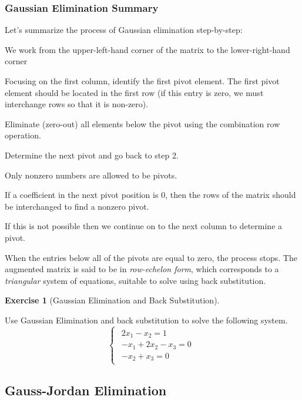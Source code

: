 \documentclass[
]{article}
\theoremstyle{definition}
\theoremstyle{definition}
\theoremstyle{definition}
\newtheorem{exercise}{Exercise}[section]
\theoremstyle{definition}
\theoremstyle{remark}
\begin{document}
\hypertarget{gaussian-elimination-summary}{%
\subsubsection{Gaussian Elimination Summary}\label{gaussian-elimination-summary}}

Let's summarize the process of Gaussian elimination step-by-step:

We work from the upper-left-hand corner of the matrix to the lower-right-hand corner

Focusing on the first column, identify the first pivot element. The first pivot element should be located in the first row (if this entry is zero, we must interchange rows so that it is non-zero).

Eliminate (zero-out) all elements below the pivot using the combination row operation.

Determine the next pivot and go back to step 2.

Only nonzero numbers are allowed to be pivots.

If a coefficient in the next pivot position is 0, then the rows of the matrix should be interchanged to find a nonzero pivot.

If this is not possible then we continue on to the next column to determine a pivot.

When the entries below all of the pivots are equal to zero, the process stops. The augmented matrix is said to be in \emph{row-echelon form}, which corresponds to a \emph{triangular} system of equations, suitable to solve using back substitution.

\begin{exercise}[Gaussian Elimination and Back Substitution]
\protect\hypertarget{exr:gaussianelim}{}\label{exr:gaussianelim}

Use Gaussian Elimination and back substitution to solve the following system.
\[\begin{cases}\begin{align}
2x_1-x_2=1\\
-x_1+2x_2-x_3=0\\
-x_2+x_3=0\end{align}\end{cases}\]
\vspace{3cm}

\end{exercise}

\hypertarget{gauss-jordan-elimination}{%
\subsection{Gauss-Jordan Elimination}\label{gauss-jordan-elimination}}
\end{document}
